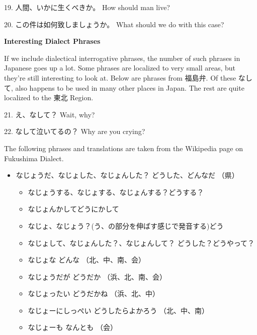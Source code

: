 \par{19. 人間、いかに生くべきか。 \hfill\break
How should man live? }

\par{20. この件は如何致しましょうか。 \hfill\break
What should we do with this case? }

\begin{center}
\textbf{Interesting Dialect Phrases }
\end{center}

\par{ If we include dialectical interrogative phrases, the number of such phrases in Japanese goes up a lot. Some phrases are localized to very small areas, but they're still interesting to look at. Below are phrases from 福島弁. Of these なして, also happens to be used in many other places in Japan. The rest are quite localized to the 東北 Region. }

\par{21. え、なして？ \hfill\break
Wait, why? }

\par{22. なして泣いてるの？ \hfill\break
Why are you crying? }

\par{ The following phrases and translations are taken from the Wikipedia page on Fukushima Dialect. }

\begin{itemize}
 
\item なじょうだ、なじょした、なじょんした？ \textrightarrow  どうした、どんなだ （県） 
\begin{itemize}
 
\item なじょうする、なじょする、なじょんする？\textrightarrow どうする？  
\item なじょんかして\textrightarrow どうにかして  
\item なじょ、なじょう？(う、の部分を伸ばす感じで発音する)\textrightarrow  どう  
\item なじょして、なじょんした？、なじょんして？ \textrightarrow  どうした？どうやって？  
\item なじょな \textrightarrow  どんな （北、中、南、会）  
\item なじょうだが \textrightarrow  どうだか （浜、北、南、会）  
\item なじょったい \textrightarrow  どうだかね （浜、北、中）  
\item なじょーにしっぺい \textrightarrow  どうしたらよかろう （北、中、南）  
\item なじょーも \textrightarrow  なんとも （会） 
\end{itemize}

\end{itemize}
     